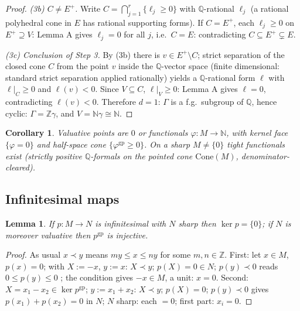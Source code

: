 \documentclass[11pt]{article}
\newtheorem{lemma}[theorem]{Lemma}
\newtheorem{corollary}[theorem]{Corollary}
\theoremstyle{definition}
\newcommand{\gp}{\mathrm{gp}}
\newcommand{\Cone}{\mathrm{Cone}}
\newcommand{\N}{\mathbb{N}}
\newcommand{\Z}{\mathbb{Z}}
\newcommand{\Q}{\mathbb{Q}}
\begin{document}
\begin{proof}
\emph{(3b) $C\ne E^+$.} Write $C=\bigcap_{j=1}^{r}
\{\ell_j\ge0\}$ with $\Q$-rational $\ell_j$ (a rational
polyhedral cone in $E$ has rational supporting forms). If
$C=E^+$, each $\ell_j\ge0$ on $E^+\supseteq V$: Lemma A gives
$\ell_j=0$ for all $j$, i.e.\ $C=E$: contradicting
$C\subseteq E^+\subsetneq E$.

\emph{(3c) Conclusion of Step 3.} By (3b) there is
$v\in E^+\setminus C$; strict separation of the closed cone $C$
from the point $v$ inside the $\Q$-vector space (finite
dimensional: standard strict separation applied rationally)
yields a $\Q$-rational form $\ell$ with $\ell|_C\ge0$ and
$\ell(v)<0$. Since $V\subseteq C$, $\ell|_V\ge0$: Lemma A gives
$\ell=0$, contradicting $\ell(v)<0$. Therefore $d=1$: $\Gamma$
is a f.g.\ subgroup of $\Q$, hence cyclic: $\Gamma=\Z\gamma$,
and $V=\N\gamma\cong\N$.
\end{proof}

\begin{corollary}\label{cor:function}
Valuative points are $0$ or functionals $\varphi:M\to\mathbb N$, with
kernel face $\{\varphi=0\}$ and half-space cone
$\{\varphi^{\gp}\ge0\}$. On a sharp $M\ne\{0\}$ tight functionals
exist \textup{(}strictly positive $\Q$-formals on the pointed cone
$\Cone(M)$, denominator-cleared\textup{)}.
\end{corollary}

\subsection{Infinitesimal maps}

\begin{lemma}\label{lem:inj0}
If $p:M\to N$ is infinitesimal with $N$ sharp then $\ker p=\{0\}$; if
$N$ is moreover valuative then $p^{\gp}$ is injective.
\end{lemma}

\begin{proof}
As usual $x\prec y$ means $my\le x\le ny$ for some $m,n\in\Z$.
First: let $x\in M$, $p(x)=0$; with $X:=-x$, $y:=x$: $X\prec y$;
$p(X)=0\in N$; $p(y)\prec0$ reads $0\le p(y)\le0$ \checkmark; the condition
gives $-x\in M$, a unit: $x=0$.
Second: $X=x_1-x_2\in\ker p^{\gp}$; $y:=x_1+x_2$: $X\prec y$;
$p(X)=0$; $p(y)\prec0$ gives $p(x_1)+p(x_2)=0$ in $N$; $N$ sharp:
each $=0$; first part: $x_i=0$.
\end{proof}
\end{document}
